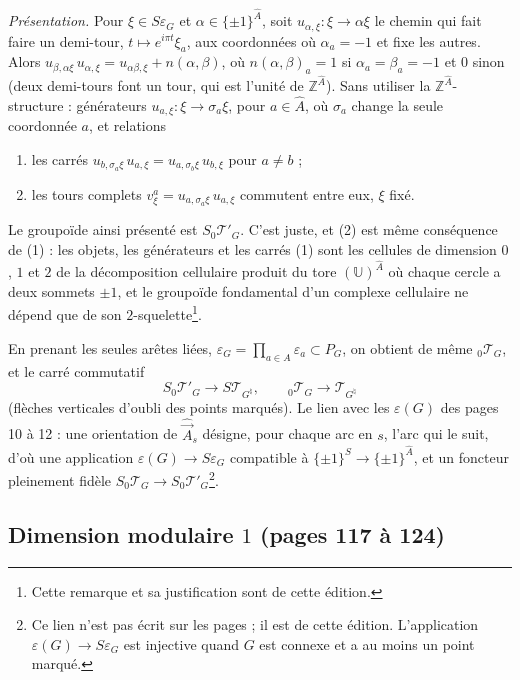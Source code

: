 \documentclass[11pt,a4paper]{article}
\begin{document}
\emph{Présentation.} Pour $\xi \in S\varepsilon_G$ et $\alpha \in
\{\pm1\}^{\hat A}$, soit $u_{\alpha, \xi} : \xi \to \alpha\xi$ le chemin qui
fait faire un demi-tour, $t \mapsto e^{i\pi t}\xi_a$, aux coordonnées où
$\alpha_a = -1$ et fixe les autres. Alors $u_{\beta, \alpha\xi}\, u_{\alpha,
\xi} = u_{\alpha\beta, \xi} + n(\alpha, \beta)$, où $n(\alpha,\beta)_a = 1$ si
$\alpha_a = \beta_a = -1$ et $0$ sinon (deux demi-tours font un tour, qui est
l'unité de $\mathbb{Z}^{\hat A}$). Sans utiliser la
$\mathbb{Z}^{\hat A}$-structure : générateurs $u_{a, \xi} : \xi \to \sigma_a
\xi$, pour $a \in \hat A$, où $\sigma_a$ change la seule coordonnée $a$, et
relations
\begin{enumerate}
\item[(1)] les carrés $u_{b, \sigma_a\xi}\, u_{a, \xi} = u_{a, \sigma_b\xi}\,
u_{b, \xi}$ pour $a \neq b$ ;
\item[(2)] les tours complets $v^a_\xi = u_{a, \sigma_a \xi}\, u_{a, \xi}$
commutent entre eux, $\xi$ fixé.
\end{enumerate}
Le groupoïde ainsi présenté est $S_0\mathcal{T}'_G$. C'est juste, et (2) est
même conséquence de (1) : les objets, les générateurs et les carrés (1) sont
les cellules de dimension $0$, $1$ et $2$ de la décomposition cellulaire
produit du tore $(\mathbb{U})^{\hat A}$ où chaque cercle a deux sommets
$\pm 1$, et le groupoïde fondamental d'un complexe cellulaire ne dépend que de
son $2$-squelette\footnote{Cette remarque et sa justification sont de cette
édition.}.

En prenant les seules arêtes liées, $\varepsilon_G = \prod_{a \in A}
\varepsilon_a \subset P_G$, on obtient de même ${}_0\mathcal{T}_G$, et le
carré commutatif
\[
S_0\mathcal{T}'_G \to S\mathcal{T}_{G^\natural}, \qquad {}_0\mathcal{T}_G \to
\mathcal{T}_{G^\natural}
\]
(flèches verticales d'oubli des points marqués). Le lien avec les
$\varepsilon(G)$ des pages 10 à 12 : une orientation de $\hat{\vec A}_s$
désigne, pour chaque arc en $s$, l'arc qui le suit, d'où une application
$\varepsilon(G) \to S\varepsilon_G$ compatible à $\{\pm1\}^S \to \{\pm1\}^{\hat
A}$, et un foncteur pleinement fidèle $S_0\mathcal{T}_G \to
S_0\mathcal{T}'_G$\footnote{Ce lien n'est pas écrit sur les pages ; il est de
cette édition. L'application $\varepsilon(G) \to S\varepsilon_G$ est injective
quand $G$ est connexe et a au moins un point marqué.}.

\subsection*{Dimension modulaire $1$ (pages 117 à 124)}
\end{document}
